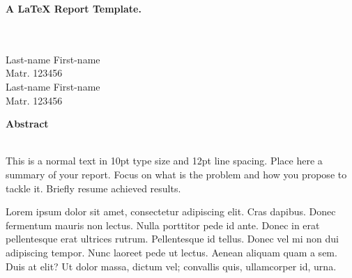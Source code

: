 \documentclass[a4paper,10pt]{article}
\newenvironment*{mytitle}{\begin{LARGE}\bf}{\end{LARGE}\\[1.5ex]}%
\newenvironment*{myabstract}{\begin{Large}\bf}{\end{Large}\\[2.5ex]}%
\begin{document}
\begin{mytitle} A LaTeX Report Template. \end{mytitle}
%
%
\\
Last-name First-name\\
Matr. 123456\\
\hspace{10ex}
Last-name First-name\\
Matr. 123456\\[10ex]

\begin{myabstract} Abstract \end{myabstract}
This is a normal text in 10pt type size and 12pt line spacing.
Place here a summary of your report. Focus on what is the problem and how you
propose to tackle it. Briefly resume achieved results.

Lorem ipsum dolor sit amet, consectetur adipiscing elit. Cras dapibus. Donec
fermentum mauris non lectus. Nulla porttitor pede id ante. Donec in erat
pellentesque erat ultrices rutrum. Pellentesque id tellus. Donec vel mi non dui
adipiscing tempor.  Nunc laoreet pede ut lectus. Aenean aliquam quam a sem. Duis
at elit? Ut dolor massa, dictum vel; convallis quis, ullamcorper id, urna.
\end{document}
